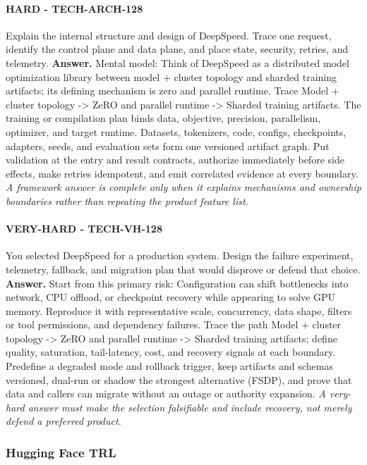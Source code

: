\paragraph{HARD - TECH-ARCH-128} Explain the internal structure and design of DeepSpeed. Trace one request, identify the control plane and data plane, and place state, security, retries, and telemetry.
\textbf{Answer.} Mental model: Think of DeepSpeed as a distributed model optimization library between model + cluster topology and sharded training artifacts; its defining mechanism is zero and parallel runtime. Trace Model + cluster topology -> ZeRO and parallel runtime -> Sharded training artifacts. The training or compilation plan binds data, objective, precision, parallelism, optimizer, and target runtime. Datasets, tokenizers, code, configs, checkpoints, adapters, seeds, and evaluation sets form one versioned artifact graph. Put validation at the entry and result contracts, authorize immediately before side effects, make retries idempotent, and emit correlated evidence at every boundary.
\textit{A framework answer is complete only when it explains mechanisms and ownership boundaries rather than repeating the product feature list.}
\paragraph{VERY-HARD - TECH-VH-128} You selected DeepSpeed for a production system. Design the failure experiment, telemetry, fallback, and migration plan that would disprove or defend that choice.
\textbf{Answer.} Start from this primary risk: Configuration can shift bottlenecks into network, CPU offload, or checkpoint recovery while appearing to solve GPU memory. Reproduce it with representative scale, concurrency, data shape, filters or tool permissions, and dependency failures. Trace the path Model + cluster topology -> ZeRO and parallel runtime -> Sharded training artifacts; define quality, saturation, tail-latency, cost, and recovery signals at each boundary. Predefine a degraded mode and rollback trigger, keep artifacts and schemas versioned, dual-run or shadow the strongest alternative (FSDP), and prove that data and callers can migrate without an outage or authority expansion.
\textit{A very-hard answer must make the selection falsifiable and include recovery, not merely defend a preferred product.}
\subsubsection*{Hugging Face TRL}
